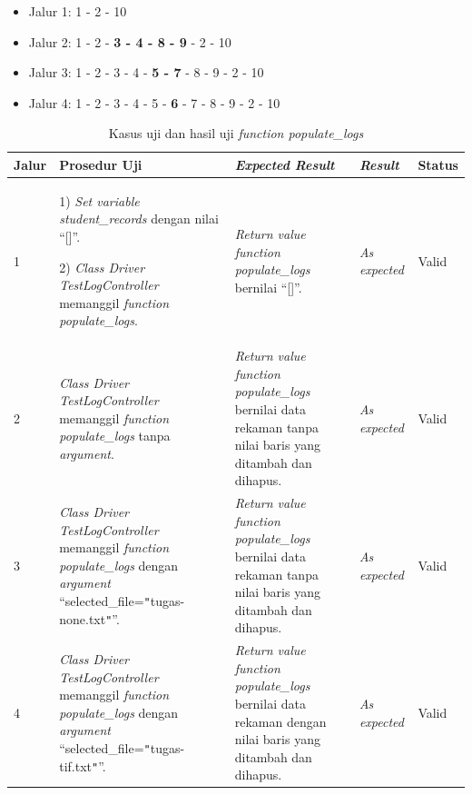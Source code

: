 \begin{itemize}
\item Jalur 1: 1 - 2 - 10
\item Jalur 2: 1 - 2 - \textbf{3 - 4 - 8 - 9} - 2 - 10
\item Jalur 3: 1 - 2 - 3 - 4 - \textbf{5 - 7} - 8 - 9 - 2 - 10
\item Jalur 4: 1 - 2 - 3 - 4 - 5 - \textbf{6} - 7 - 8 - 9 - 2 - 10
\end{itemize}
\newpage %
\begin{longtable}{|P{.06\textwidth}|P{.30\textwidth}|P{.30\textwidth}|P{.10\textwidth}|P{.08\textwidth}|}
  \caption{Kasus uji dan hasil uji \emph{function populate\_logs}} \label{jalur:populate_logs}\\
  \hline
  \textbf{Jalur} & \textbf{Prosedur Uji} & \textbf{\emph{Expected Result}} & \textbf{\emph{Result}} & \textbf{Status} \\\hline
  1 & 1) \emph{Set variable student\_records} dengan nilai ``[]''.\par\null\par
      2) \emph{Class Driver TestLogController} memanggil \emph{function populate\_logs}.
                                         & \emph{Return value} \emph{function populate\_logs} bernilai
                                           ``[]''. & \emph{As expected} & Valid \\\hline
  2 & \emph{Class Driver TestLogController} memanggil \emph{function populate\_logs} tanpa \emph{argument}.
                                         & \emph{Return value} \emph{function populate\_logs} bernilai data
                                           rekaman tanpa nilai baris yang ditambah dan dihapus.
                                                                           & \emph{As expected} & Valid \\\hline
  3 & \emph{Class Driver TestLogController} memanggil \emph{function populate\_logs} dengan \emph{argument}
      ``selected\_file=\texttt{"}tugas-none.txt\texttt{"}''. & \emph{Return value} \emph{function populate\_logs} bernilai data
                                                               rekaman tanpa nilai baris yang ditambah dan dihapus.
                                                                           & \emph{As expected} & Valid \\\hline
  4 & \emph{Class Driver TestLogController} memanggil \emph{function populate\_logs} dengan \emph{argument}
      ``selected\_file=\texttt{"}tugas-tif.txt\texttt{"}''. & \emph{Return value} \emph{function populate\_logs} bernilai data
                                                               rekaman dengan nilai baris yang ditambah dan dihapus.
                                                                           & \emph{As expected} & Valid \\\hline
\end{longtable}

